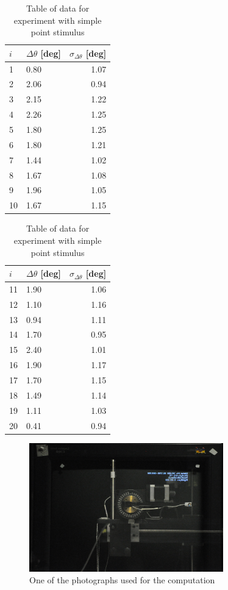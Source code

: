 \documentclass[a4paper]{article}  %
\begin{document}
\begin{table}[htb!]\label{tab:table_exp_1}
\centering
\begin{tabular}{|l|l|r|} \hline
$i$ & $\Delta \theta $ [deg] & $\sigma_{\Delta \theta}$ [deg] \\
\hline 
1 & 0.80 & 1.07 \\ \hline 
2 & 2.06 & 0.94 \\ \hline 
3 & 2.15 & 1.22 \\ \hline
4 & 2.26 & 1.25 \\ \hline
5 & 1.80 & 1.25 \\ \hline
6 & 1.80 & 1.21 \\ \hline
7 & 1.44 & 1.02 \\ \hline
8 & 1.67 & 1.08 \\ \hline
9 & 1.96 & 1.05 \\ \hline
10 & 1.67 & 1.15 \\
\hline
\end{tabular}
\begin{tabular}{|l|l|r|} \hline
$i$ & $\Delta \theta$ [deg] & $\sigma_{\Delta \theta}$ [deg]\\
\hline 
11 & 1.90 & 1.06 \\  \hline
12 & 1.10 & 1.16 \\  \hline
13 & 0.94 & 1.11 \\ \hline
14 & 1.70 & 0.95 \\ \hline
15 & 2.40 & 1.01 \\ \hline
16 & 1.90 & 1.17 \\ \hline
17 & 1.70 & 1.15 \\ \hline
18 & 1.49 & 1.14 \\ \hline
19 & 1.11 & 1.03 \\ \hline
20 & 0.41 & 0.94 \\
\hline
\end{tabular}
\caption{Table of data for experiment with simple point stimulus}
\end{table}

\begin{figure}[htb!]
\centering
\includegraphics[width=0.75\textwidth]{images/test_1_simple/DSC_0138.JPG}
\caption{One of the photographs used for the computation}
\end{figure}
\end{document}
